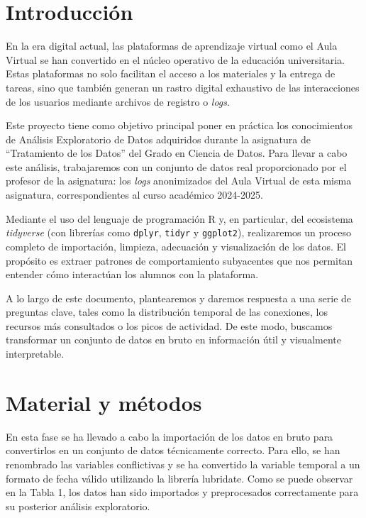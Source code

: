 \documentclass[notspecified,article,submit,moreauthors,pdftex]{Definitions/mdpi}
\begin{document}

\section{Introducción}\label{introducciuxf3n}

En la era digital actual, las plataformas de aprendizaje virtual como el
Aula Virtual se han convertido en el núcleo operativo de la educación
universitaria. Estas plataformas no solo facilitan el acceso a los
materiales y la entrega de tareas, sino que también generan un rastro
digital exhaustivo de las interacciones de los usuarios mediante
archivos de registro o \emph{logs}.

Este proyecto tiene como objetivo principal poner en práctica los
conocimientos de Análisis Exploratorio de Datos adquiridos durante la
asignatura de ``Tratamiento de los Datos'' del Grado en Ciencia de
Datos. Para llevar a cabo este análisis, trabajaremos con un conjunto de
datos real proporcionado por el profesor de la asignatura: los
\emph{logs} anonimizados del Aula Virtual de esta misma asignatura,
correspondientes al curso académico 2024-2025.

Mediante el uso del lenguaje de programación R y, en particular, del
ecosistema \emph{tidyverse} (con librerías como \texttt{dplyr},
\texttt{tidyr} y \texttt{ggplot2}), realizaremos un proceso completo de
importación, limpieza, adecuación y visualización de los datos. El
propósito es extraer patrones de comportamiento subyacentes que nos
permitan entender cómo interactúan los alumnos con la plataforma.

A lo largo de este documento, plantearemos y daremos respuesta a una
serie de preguntas clave, tales como la distribución temporal de las
conexiones, los recursos más consultados o los picos de actividad. De
este modo, buscamos transformar un conjunto de datos en bruto en
información útil y visualmente interpretable.

\section{Material y métodos}\label{material-y-muxe9todos}

En esta fase se ha llevado a cabo la importación de los datos en bruto
para convertirlos en un conjunto de datos técnicamente correcto. Para
ello, se han renombrado las variables conflictivas y se ha convertido la
variable temporal a un formato de fecha válido utilizando la librería
lubridate. Como se puede observar en la Tabla 1, los datos han sido
importados y preprocesados correctamente para su posterior análisis
exploratorio.
\end{document}
